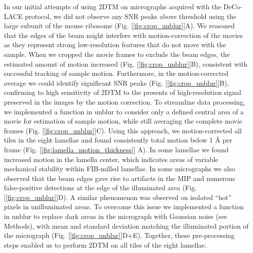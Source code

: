 \documentclass[
]{article}
\begin{document}
In our initial attempts of using 2DTM on micrographs acquired with the DeCo-LACE
protocol, we did not observe any SNR peaks above threshold using the large
subunit of the mouse ribosome (Fig. {[}\ref{fig:crop_unblur}{]}A). We reasoned that
the edges of the beam might interfere with motion-correction of the movies as
they represent strong low-resolution features that do not move with the sample.
When we cropped the movie frames to exclude the beam edges, the estimated amount
of motion increased (Fig. {[}\ref{fig:crop_unblur}{]}B), consistent with successful
tracking of sample motion. Furthermore, in the motion-corrected average we could
identify significant SNR peaks (Fig. {[}\ref{fig:crop_unblur}{]}B), confirming to
high sensitivity of 2DTM to the presents of high-resolution signal preserved in
the images by the motion correction. To streamline data processing, we
implemented a function in unblur to consider only a defined central area of a
movie for estimation of sample motion, while still averaging the complete movie
frames (Fig. {[}\ref{fig:crop_unblur}{]}C). Using this approach, we motion-corrected
all tiles in the eight lamellae and found consistently total motion below 1 Å
per frame (Fig. {[}\ref{fig:lamella_motion_thickness}{]} A). In some lamellae we
found increased motion in the lamella center, which indicates areas of variable
mechanical stability within FIB-milled lamellae. In some micrographs we also
observed that the beam edges gave rise to artifacts in the MIP and numerous
false-positive detections at the edge of the illuminated area (Fig. {[}\ref{fig:crop_unblur}{]}D). A
similar phenomenon was observed on isolated ``hot'' pixels in unilluminated areas.
To overcome this issue we implemented a function in unblur to replace
dark areas in the micrograph with Gaussian noise (see Methods), with
mean and standard deviation matching the illuminated portion of the micrograph
(Fig. {[}\ref{fig:crop_unblur}{]}D+E). Together, these pre-processing steps enabled us to perform 2DTM on
all tiles of the eight lamellae.
\end{document}

